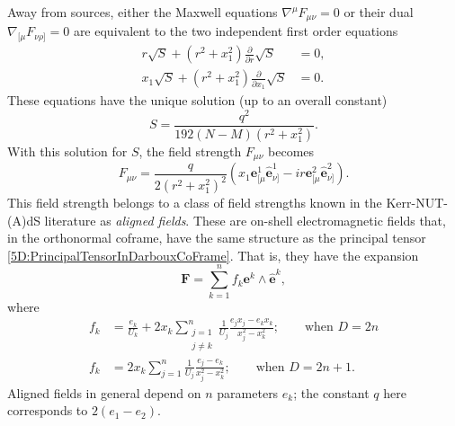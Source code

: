 Away from sources, either the Maxwell equations $ \nabla^{\mu} F_{\mu \nu} = 0$ or their dual $ \nabla_{[\mu}
F_{\nu \rho]} = 0$ are equivalent to the two independent first order
equations 
%
\begin{align} 
    r \sqrt{S} + \left(r^{2} + x_{1}^{2}\right) \frac{\partial}{ \partial r} \sqrt{S} &=
    0, \\
    x_{1} \sqrt{S}  + \left(r^{2} + x_{1}^{2}\right) \frac{\partial}{ \partial x_{1}}
    \sqrt{S} &= 0.
\end{align}
%
These equations have the unique solution (up to an overall constant)
%
\begin{equation} \label{5D:ScalarFromMaxwellEquations} 
    S = \frac{q^{2}}{192(N - M)(r^{2} + x_{1}^{2})}.
\end{equation}
%
With this solution for $S$, the field strength $F_{\mu \nu}$ becomes
%
 \begin{equation} 
     F_{\mu \nu} = \frac{q}{2(r^{2} + x_{1}^{2})^{2}} \left(x_{1} \mathbf{e}^{1}_{[\mu}
     \mathbf{\hat{e}}^{1}_{\nu]} - i r \mathbf{e}^{2}_{[\mu}
 \mathbf{\hat{e}}^{2}_{\nu]}\right).
 \end{equation}
%
This field strength belongs to a class of field strengths known in the
Kerr-NUT-(A)dS literature as \emph{aligned fields}. These are on-shell electromagnetic
fields that, in the orthonormal coframe, have the same structure as the principal tensor
\eqref{5D:PrincipalTensorInDarbouxCoFrame}. That is, they have the expansion \cite{Krtous:2007xg}
%
\begin{equation} \label{5D:AlignedFieldExpansion} 
    \mathbf{F} = \sum_{k = 1}^{n} f_{k} \mathbf{e}^{k} \wedge \mathbf{\hat{e}}^{k},
\end{equation}
where
\begin{equation} \label{5D:AlignedFieldComponents} 
    \begin{split}
        f_{k} &= \frac{e_{k}}{U_{k}} + 2 x_{k} \sum_{ \substack{j = 1 \\ j\neq k}}^{n} \frac{1}{U_{j}} \frac{e_{j} x_{j}
        - e_{k}x_{k}}{x_{j}^{2} - x_{k}^{2}}; \qquad \text{when }D = 2n \\
            f_{k} &= 2 x_{k} \sum_{j = 1}^{n} \frac{1}{U_{j}} \frac{e_{j} - e_{k}}{x_{j}^{2} - x_{k}^{2}};
            \qquad \text{when }D = 2n + 1.
    \end{split}
\end{equation}
%
Aligned fields in
general depend on $n$ parameters $e_{k}$; the constant $q$ here corresponds to $2(e_{1} -
e_{2})$. 

